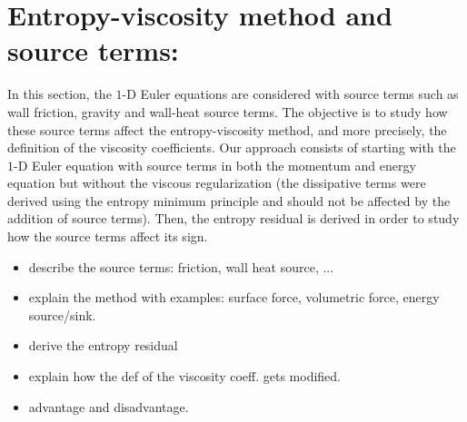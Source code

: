 \section{Entropy-viscosity method and source terms:} \label{sec:ev_source_terms}
In this section, the $1$-D Euler equations are considered with source terms such as wall friction, gravity and wall-heat source terms. The objective is to study how these source terms affect the entropy-viscosity method, and more precisely, the definition of the viscosity coefficients. Our approach consists of starting with the $1$-D Euler equation with source terms in both the momentum and energy equation but without the viscous regularization (the dissipative terms were derived using the entropy minimum principle and should not be affected by the addition of source terms). Then, the entropy residual is derived in order to study how the source terms affect its sign.
\begin{itemize}
\item describe the source terms: friction, wall heat source, ...
\item explain the method with examples: surface force, volumetric force, energy source/sink.
\item derive the entropy residual
\item explain how the def of the viscosity coeff. gets modified.
\item advantage and disadvantage.
\end{itemize}

